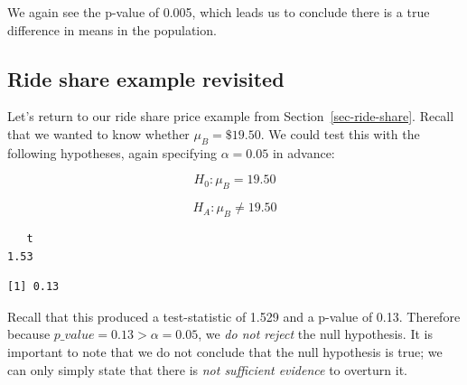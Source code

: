 \documentclass[
  letterpaper,
  DIV=11,
  numbers=noendperiod]{scrreprt}
\newenvironment{Shaded}{\begin{snugshade}}{\end{snugshade}}
\newcommand{\AttributeTok}[1]{\textcolor[rgb]{0.40,0.45,0.13}{#1}}
\newcommand{\FloatTok}[1]{\textcolor[rgb]{0.68,0.00,0.00}{#1}}
\newcommand{\FunctionTok}[1]{\textcolor[rgb]{0.28,0.35,0.67}{#1}}
\newcommand{\NormalTok}[1]{\textcolor[rgb]{0.00,0.23,0.31}{#1}}
\newcommand{\OtherTok}[1]{\textcolor[rgb]{0.00,0.23,0.31}{#1}}
\newcommand{\SpecialCharTok}[1]{\textcolor[rgb]{0.37,0.37,0.37}{#1}}
\newcommand{\StringTok}[1]{\textcolor[rgb]{0.13,0.47,0.30}{#1}}
\theoremstyle{definition}
\theoremstyle{remark}
\begin{document}
We again see the p-value of 0.005, which leads us to conclude there is a
true difference in means in the population.

\hypertarget{sec-ride-two-tail}{%
\subsection{Ride share example revisited}\label{sec-ride-two-tail}}

Let's return to our ride share price example from
Section~\ref{sec-ride-share}. Recall that we wanted to know whether
\(\mu_B = \$19.50\). We could test this with the following hypotheses,
again specifying \(\alpha = 0.05\) in advance:

\[H_0: \mu_B = 19.50\]

\[H_A: \mu_B \neq 19.50\]

\begin{Shaded}
\end{Shaded}

\begin{verbatim}
   t 
1.53 
\end{verbatim}

\begin{Shaded}
\end{Shaded}

\begin{verbatim}
[1] 0.13
\end{verbatim}

Recall that this produced a test-statistic of 1.529 and a p-value of
0.13. Therefore because \(p\_value = 0.13 > \alpha = 0.05\), we \emph{do
not reject} the null hypothesis. It is important to note that we do not
conclude that the null hypothesis is true; we can only simply state that
there is \emph{not sufficient evidence} to overturn it.
\end{document}
